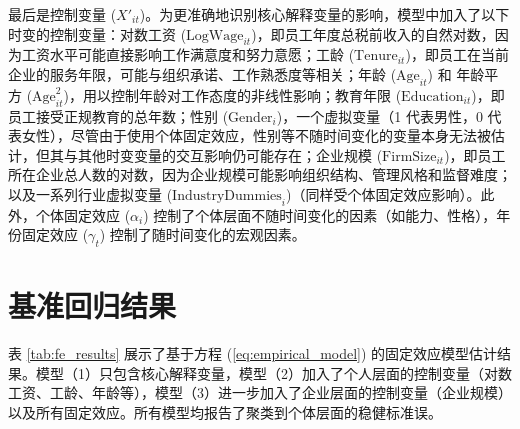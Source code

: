 最后是控制变量 (\(X'_{it}\))。为更准确地识别核心解释变量的影响，模型中加入了以下时变的控制变量：{对数工资 (\(\text{LogWage}_{it}\))}，即员工年度总税前收入的自然对数，因为工资水平可能直接影响工作满意度和努力意愿；{工龄 (\(\text{Tenure}_{it}\))}，即员工在当前企业的服务年限，可能与组织承诺、工作熟悉度等相关；{年龄 (\(\text{Age}_{it}\))} 和 {年龄平方 (\(\text{Age}^2_{it}\))}，用以控制年龄对工作态度的非线性影响；{教育年限 (\(\text{Education}_{it}\))}，即员工接受正规教育的总年数；{性别 (\(\text{Gender}_{i}\))}，一个虚拟变量（1 代表男性，0 代表女性），尽管由于使用个体固定效应，性别等不随时间变化的变量本身无法被估计，但其与其他时变变量的交互影响仍可能存在；{企业规模 (\(\text{FirmSize}_{it}\))}，即员工所在企业总人数的对数，因为企业规模可能影响组织结构、管理风格和监督难度；以及一系列{行业虚拟变量 (\(\text{IndustryDummies}_{i}\))}（同样受个体固定效应影响）。此外，个体固定效应 (\(\alpha_i\)) 控制了个体层面不随时间变化的因素（如能力、性格），年份固定效应 (\(\gamma_t\)) 控制了随时间变化的宏观因素。

\section{基准回归结果}\label{sec:empirical_baseline_results}

表 \ref{tab:fe_results} 展示了基于方程 (\ref{eq:empirical_model}) 的固定效应模型估计结果。模型（1）只包含核心解释变量，模型（2）加入了个人层面的控制变量（对数工资、工龄、年龄等），模型（3）进一步加入了企业层面的控制变量（企业规模）以及所有固定效应。所有模型均报告了聚类到个体层面的稳健标准误。

